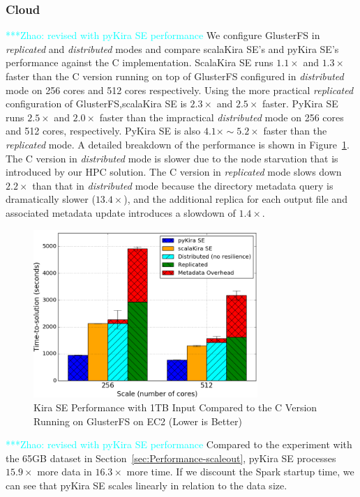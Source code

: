 \documentclass[10pt,journal,compsoc]{IEEEtran}
\newcommand{\zhaonote}[1]{{\textcolor{cyan}    { ***Zhao:      #1 }}}
\newcommand{\zhaonote}[1]{}
\begin{document}
\subsubsection{Cloud}
\label{sec:1TB-EC2}
\zhaonote{revised with pyKira SE performance}
We configure GlusterFS in \emph{replicated} and \emph{distributed} modes and compare scalaKira
SE's and pyKira SE's performance against the C implementation. 
ScalaKira SE runs $1.1\times$ and $1.3\times$ faster than the C version running on top of
GlusterFS configured in \emph{distributed} mode on 256 cores and 512 cores respectively. 
Using the more practical \emph{replicated} configuration of GlusterFS,scalaKira SE is $2.3\times$ and $2.5\times$ faster. 
PyKira SE runs $2.5\times$ and $2.0\times$ faster than the impractical \emph{distributed} mode on 256 cores and 512 cores, respectively.
PyKira SE is also $4.1\times\sim5.2\times$ faster than the \emph{replicated} mode.
A detailed breakdown of the performance is shown in Figure~\ref{fig:1tb-ec2}.
The C version in \emph{distributed} mode is slower due to the node starvation that is introduced by our HPC solution.
The C version in \emph{replicated} mode slows down $2.2\times$ than that in \emph{distributed} mode because the directory metadata query
is dramatically slower ($13.4\times$), and the additional replica for each output file and associated metadata update introduces a slowdown
of $1.4\times$.

\begin{figure}[t]
	\begin{center}
		\includegraphics[width=85mm]{pictures/1TB-EC2}
		\caption{Kira SE Performance with 1TB Input Compared to the C Version Running on GlusterFS on EC2 (Lower is Better)
		\label{fig:1tb-ec2}}
  	\end{center}
\end{figure}

\zhaonote{revised with pyKira SE performance}
Compared to the experiment with the 65GB dataset in Section~\ref{sec:Performance-scaleout},
pyKira SE processes $15.9\times$ more data in $16.3\times$ more time. If we discount the Spark
startup time, we can see that pyKira SE scales linearly in relation to the data size.
\end{document}
